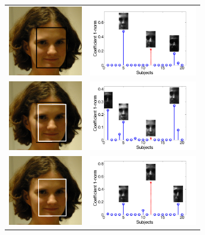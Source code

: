 \begin{figure}
\centering
\begin{tabular}{cc}
\includegraphics[height=1.2in]{figures_cvpr/promo/case1/detector.png}& \hspace{3mm}
\includegraphics[height=1.2in]{figures_cvpr/promo/case1/sci_with_axis_face_case1.png} \\
\includegraphics[height=1.2in]{figures_cvpr/promo/alignment_and_detector.png}& \hspace{3mm}
\includegraphics[height=1.2in]{figures_cvpr/promo/case2/sci_with_axis_face_case2.png} \\
\includegraphics[height=1.2in]{figures_cvpr/promo/case3/alignment.png} & \hspace{3mm}
\includegraphics[height=1.2in]{figures_cvpr/promo/case3/sci_with_axis_face_case3.png}

\end{tabular}
\end{figure}
